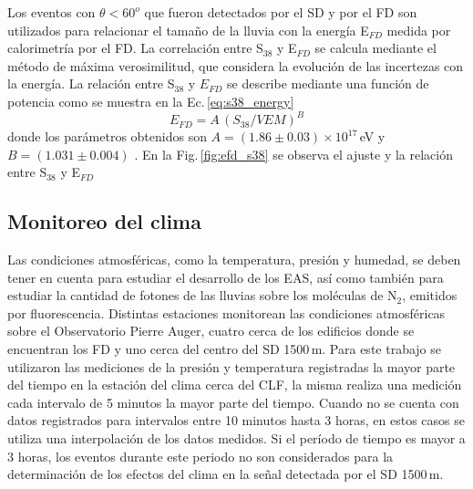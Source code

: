 Los eventos con $\theta<60^o$  que fueron detectados por el SD y por el FD son utilizados para relacionar el tamaño de la lluvia con la energía  E$_{FD}$ medida por calorimetría por el FD.  La correlación entre S$_{38}$ y E$_{FD}$ se calcula mediante el método de máxima verosimilitud, que considera la evolución de las incertezas con la energía. La relación entre S$_{38}$ y $E_{FD}$ se describe mediante una función de potencia como se muestra en la Ec.\,\ref{eq:s38_energy}
\begin{equation}
	E_{FD}= A\, (S_{38}/VEM)^B
	\label{eq:s38_energy}
\end{equation}
donde los parámetros obtenidos son $A=(1.86\pm0.03)\times 10^{17}\,$eV y $B=(1.031\pm0.004)$  \cite{tobepublished}. En la Fig.\,\ref{fig:efd_s38} se observa el ajuste y la relación entre  S$_{38}$ y E$_{FD}$






\subsection{Monitoreo del clima}\label{seccion:clima}

Las condiciones atmosféricas, como la temperatura, presión y humedad, se deben tener en cuenta para estudiar el desarrollo de los EAS, así como también para estudiar la cantidad de fotones de las lluvias sobre los moléculas de N$_2$, emitidos por fluorescencia. Distintas estaciones monitorean las condiciones atmosféricas sobre el Observatorio Pierre Auger, cuatro cerca  de los edificios donde se encuentran los FD y uno cerca del centro del SD 1500\,m. Para este trabajo se utilizaron las mediciones de la presión y temperatura registradas la mayor parte del tiempo en la estación del clima cerca del CLF, la misma realiza una medición cada intervalo de 5 minutos la mayor parte del tiempo. Cuando no se cuenta con datos registrados para intervalos entre 10 minutos hasta 3 horas, en estos casos se utiliza una interpolación de los datos medidos. Si el período de tiempo es mayor a 3 horas, los eventos durante este periodo no son considerados para la determinación de los efectos del clima en la señal detectada por el SD 1500\,m.